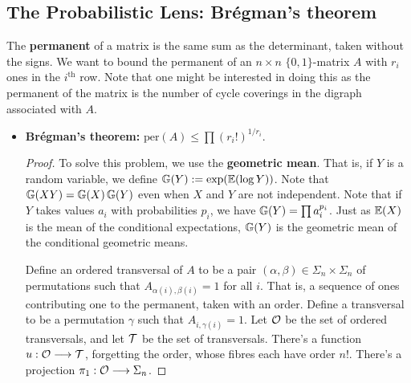 \documentclass[11pt]{article}
\newenvironment{INT}[1][]{\begin{itemize}\small\item\textbf{#1}}{\end{itemize}}
\begin{document}
\begin{chapter2}
\subsection*{The Probabilistic Lens: Br\'egman's theorem}
The \textbf{permanent} of a matrix is the same sum as the determinant, taken without the signs. We want to bound the permanent of an $n\times n$ $\{0,1\}$-matrix $A$ with $r_i$ ones in the $i^\text{th}$ row. Note that one might be interested in doing this as the permanent of the matrix is the number of cycle coverings in the digraph associated with $A$.
\begin{INT}[Br\'egman's theorem:]
$\text{per}(A)\leq \prod (r_i!)^{1/r_i}$.
\begin{proof}
To solve this problem, we use the \textbf{geometric mean}. That is, if $Y$ is a random variable, we define $\operatorname{\mathbb{G}}(Y):=\exp(\operatorname{\mathbb{E}}(\log Y))$. Note that $\operatorname{\mathbb{G}}(XY)=\operatorname{\mathbb{G}}(X)\operatorname{\mathbb{G}}(Y)$ even when $X$ and $Y$ are not independent. Note that if $Y$ takes values $a_i$ with probabilities $p_i$, we have $\operatorname{\mathbb{G}}(Y)=\prod a_i^{p_i}$. Just as $\operatorname{\mathbb{E}}(X)$ is the mean of the conditional expectations, $\operatorname{\mathbb{G}}(Y)$ is the geometric mean of the conditional geometric means.

\INDENT Define an ordered transversal of $A$ to be a pair $(\alpha,\beta)\in\Sigma_n\times\Sigma_n$ of permutations such that $A_{\alpha(i),\beta(i)}=1$ for all $i$. That is, a sequence of ones contributing one to the permanent, taken with an order. Define a transversal to be a permutation $\gamma$ such that $A_{i,\gamma(i)}=1$. Let $\mathcal{O}$ be the set of ordered transversals, and let $\mathcal{T}$ be the set of transversals. There's a  function $u:\mathcal{O}\longrightarrow\mathcal{T}$, forgetting the order, whose fibres each have order $n!$. There's a projection $\pi_1:\mathcal{O}\longrightarrow \Sigma_n$.



\end{proof}
\end{INT}
\end{chapter2}
\end{document}
